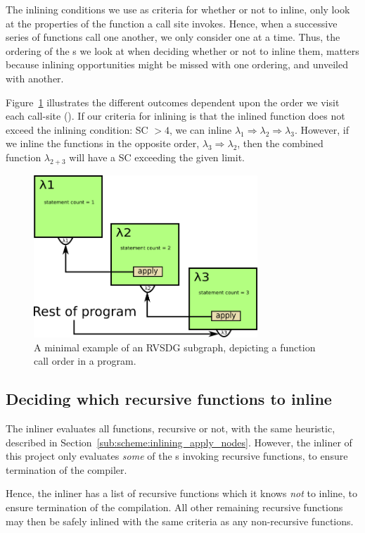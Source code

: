
The inlining conditions we use as criteria for whether or not to inline, only
look at the properties of the function a call site invokes. Hence, when a
successive series of functions call one another, we only consider one at a time.
Thus, the ordering of the \applyNode s we look at when deciding whether or not
to inline them, matters because inlining opportunities might be missed with one
ordering, and unveiled with another.

Figure~\ref{fig:inline_ordering_ex} illustrates the different outcomes dependent
upon the order we visit each call-site (\applyNode ). If our criteria for
inlining is that the inlined function does not exceed the inlining condition: SC
$> 4$, we can inline $\lambda_1 \Rightarrow \lambda_2 \Rightarrow \lambda_3$.
However, if we inline the functions in the opposite order, $\lambda_3
\Rightarrow \lambda_2$, then the combined function $\lambda_{2+3}$ will have a
SC exceeding the given limit.

\begin{figure}[H]
	\centering
	\includegraphics[width=0.75\textwidth]{figures/inline_ordering_ex}
	\caption{A minimal example of an RVSDG subgraph, depicting a function call
order in a program.}
	\label{fig:inline_ordering_ex}
\end{figure}

\subsection{Deciding which recursive functions to inline}
\label{sub:scheme:inlining_recur_apply_nodes}

The inliner evaluates all functions, recursive or not, with the same heuristic,
described in Section~\ref{sub:scheme:inlining_apply_nodes}. However, the inliner
of this project only evaluates \textit{some} of the \applyNode s invoking
recursive functions, to ensure termination of the compiler.


Hence, the inliner has a list of recursive functions which it knows \textit{not}
to inline, to ensure termination of the compilation. All other remaining
recursive functions may then be safely inlined with the same criteria as any
non-recursive functions.
